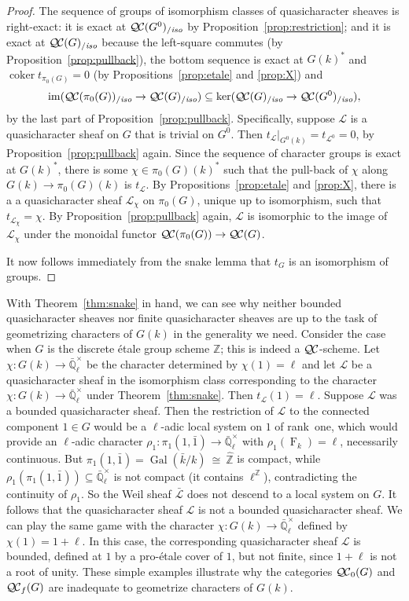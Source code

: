 \documentclass[11pt]{amsart}
\theoremstyle{plain}
\theoremstyle{definition}
\theoremstyle{remark}
\newcommand{\ZZ}{{\mathbb{Z}}}
\newcommand{\EE}{\mathbb{\bar Q}_\ell}
\newcommand{\bFq}{\bar{k}}
\newcommand{\Fq}{k}
\newcommand{\EEx}{\EE^\times}
\DeclareMathOperator{\Gal}{Gal}
\newcommand{\Frob}[1]{\operatorname{F}_{#1}}
\DeclareMathOperator{\coker}{coker}
\newcommand{\iso}{{\ \cong\ }}
\newcommand{\qcs}[1]{{\mathcal{#1}}}
\newcommand{\gqcs}[1]{{\mathcal{\bar #1}}}
\newcommand{\QC}{{\mathcal{Q\hskip-0.8pt C}}}
\newcommand{\QCb}{{\QC_0}}
\newcommand{\QCf}{{\QC_f}}
\newcommand{\QCiso}[1]{\QC(#1)_{/\textit{iso}}}
\newcommand{\image}{{\operatorname{im}}}
\newcommand{\trFrob}[1]{t_{#1}}
\newcommand\Clifton[1]{\marginpar{\smaller\smaller CC: #1}}
\begin{document}
\begin{proof}
  The sequence of groups of isomorphism classes of quasicharacter sheaves is right-exact: it is exact at
  $\QCiso{G^0}$ by Proposition~\ref{prop:restriction}; and
  it is exact at $\QCiso{G}$ because the left-square
  commutes (by Proposition~\ref{prop:pullback}), the bottom sequence
  is exact at $G(\Fq)^*$ and $\coker \trFrob{\pi_0(G)} =0$
  (by Propositions~\ref{prop:etale} and \ref{prop:X}) and
  \[
  \image(\QCiso{\pi_0(G)} \to \QCiso{G}) \subseteq \ker(\QCiso{G} \to \QCiso{G^0}),
  \]
  by the last part of Proposition~\ref{prop:pullback}. Specifically,
  suppose $\qcs{L}$ is a quasicharacter sheaf on $G$ that is trivial on
  $G^0$. Then $\trFrob{\qcs{L}}\vert_{G^0(\Fq)} = \trFrob{\qcs{L}^0} =0$,
  by Proposition~\ref{prop:pullback} again. Since the sequence of
  character groups is exact at $G(\Fq)^*$, there is
  some $\chi \in \pi_0(G)(\Fq)^*$ such that the
  pull-back of $\chi$ along $G(\Fq)\to \pi_0(G)(\Fq)$ is
  $\trFrob{\qcs{L}}$. By Propositions~\ref{prop:etale} and \ref{prop:X},
  there is a a quasicharacter sheaf $\qcs{L}_\chi$ on $\pi_0(G)$, unique up
  to isomorphism, such that $\trFrob{\qcs{L}_\chi} = \chi$. By
  Proposition~\ref{prop:pullback} again, $\qcs{L}$ is isomorphic to the
  image of $\qcs{L}_\chi$ under the monoidal functor $\QC(\pi_0(G)) \to \QC(G)$.

  It now follows immediately from the snake lemma that $\trFrob{G}$ is an
  isomorphism of groups.
\end{proof}

With Theorem~\ref{thm:snake} in hand, 
we can see why neither bounded quasicharacter sheaves 
nor finite quasicharacter sheaves are up to the task of 
geometrizing characters of $G(\Fq)$ in the generality we need.  
%
Consider the case when $G$ is the discrete \'etale group scheme $\ZZ$; 
this is indeed a $\QC$-scheme.
Let $\chi : G(\Fq) \to \EEx$ be the character determined by $\chi(1) = \ell$ 
and let $\qcs{L}$ be a quasicharacter sheaf in the isomorphism class 
corresponding to the character $\chi : G(\Fq) \to \EEx$ under Theorem~\ref{thm:snake}. 
Then $\trFrob{\qcs{L}}(1) = \ell$. Suppose $\qcs{L}$ was a bounded quasicharacter sheaf. 
Then the restriction of $\qcs{L}$ to the connected component $1\in G$ 
would be a $\ell$-adic local system on $1$ of rank~one, which would provide
an $\ell$-adic character $\rho_1 : \pi_1(1,{\bar 1}) \to \EEx$ with
$\rho_1(\Frob{\Fq}) = \ell$, necessarily continuous. 
\Clifton{I made some small changes to wording, here.}
But $\pi_1(1,{\bar 1}) = \Gal(\bFq/\Fq) \iso {\hat \ZZ}$ is compact, 
while $\rho_1(\pi_1(1,{\bar 1})) \subseteq \EEx$ is not compact (it contains $\ell^\ZZ$),
contradicting the continuity of $\rho_1$.
So the Weil sheaf $\gqcs{L}$ does not descend to a local system on $G$.
It follows that the quasicharacter sheaf $\qcs{L}$ is not a bounded quasicharacter sheaf.
%
We can play the same game with the character $\chi : G(\Fq) \to \EEx$ 
defined by $\chi(1) = 1+\ell$. In this case, the corresponding quasicharacter sheaf $\qcs{L}$ is bounded,
defined at $1$ by a pro-\'etale cover of $1$, but not finite, since $1+\ell$ is not a root of unity. 
%
These simple examples illustrate why the categories $\QCb(G)$ and $\QCf(G)$ are inadequate to geometrize characters of $G(\Fq)$.
\end{document}
